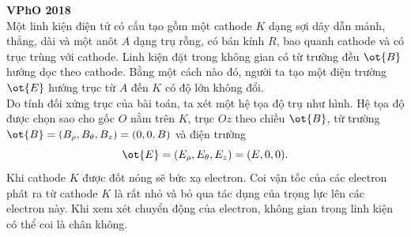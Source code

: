 \begin{vd}\textbf{VPhO 2018}\\
Một linh kiện điện tử có cấu tạo gồm một cathode $K$ dạng sợi dây dẫn mảnh, thẳng, dài và một anôt $A$ dạng trụ rỗng, có bán kính ${R}$, bao quanh cathode và có trục trùng với cathode. Linh kiện đặt trong không gian có từ trường đều $\ot{B}$ hướng dọc theo cathode. Bằng một cách nào đó, người ta tạo một điện trường $\ot{E}$ hướng trục từ ${A}$ đến ${K}$ có độ lớn không đổi.\\
Do tính đối xứng trục của bài toán, ta xét một hệ tọa độ trụ như hình. Hệ tọa độ được chọn sao cho gốc ${O}$ nằm trên ${K}$, trục ${Oz}$ theo chiều $\ot{B}$, từ trường $\ot{B}=\left(B_{\rho}, B_{\theta}, B_{z}\right)=(0,0, B)$
và điện trường
$$\ot{E}=\left(E_{\rho}, E_{\theta}, E_{z}\right)=(E, 0,0).$$ 
Khi cathode ${K}$ được đốt nóng sẽ bức xạ electron. Coi vận tốc của các electron phát ra từ cathode ${K}$ là rất nhỏ và bỏ qua tác dụng của trọng lực lên các electron này. Khi xem xét chuyển động của electron, không gian trong linh kiện có thể coi là chân không.
\begin{center}
{

\begin{tikzpicture}[x=0.75pt,y=0.75pt,yscale=-1,xscale=1]


\end{tikzpicture}}
\end{center}
\end{vd}
